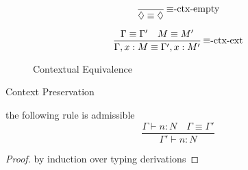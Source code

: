 \begin{figure}
\[
\frac{\ }{\lozenge\equiv\lozenge}\,\textrm{\ensuremath{\equiv}-ctx-empty}
\]

\[
\frac{\Gamma\equiv\Gamma'\quad M\equiv M'}{\Gamma,x:M\equiv\Gamma',x:M'}\,\textrm{\ensuremath{\equiv}-ctx-ext}
\]

\caption{Contextual Equivalence}
\label{fig:surface-Context-Equiv}
\end{figure}

\begin{lem}
Context Preservation

the following rule is admissible
\[
\frac{\Gamma\vdash n:N\quad\Gamma\equiv\Gamma'}{\Gamma'\vdash n:N}
\]
\end{lem}

\begin{proof}
by induction over typing derivations


\end{proof}
